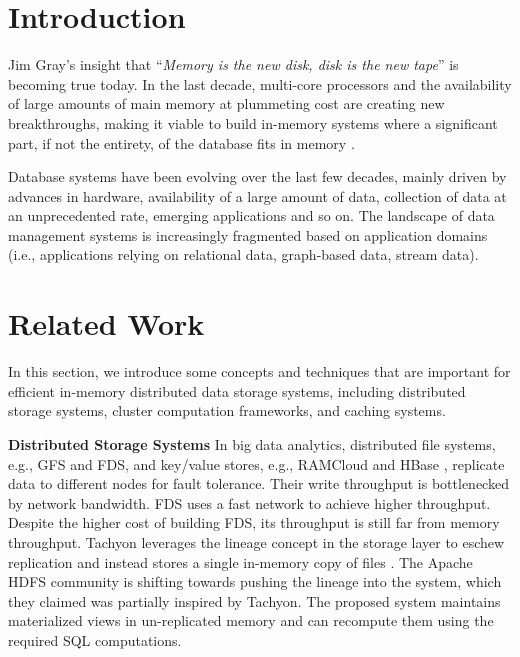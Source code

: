 \documentclass[twocolumn]{article}
\newcommand*\DNA{\textsc{dna}}
\newcommand*\Let[2]{\State #1 $\gets$ #2}
\begin{document}

\section{Introduction}
Jim Gray's insight that ``\textit{Memory is the new disk, disk is the new tape}'' is becoming true today. 
In the last decade, multi-core processors and the availability of large amounts of main memory at
plummeting cost are creating new breakthroughs, making it viable to
build in-memory systems where a significant part, if not the entirety,
of the database fits in memory \cite{Hao:2015}.

Database systems have been evolving over the last few decades, mainly
driven by advances in hardware, availability of a large amount of data,
collection of data at an unprecedented rate, emerging applications and
so on. The landscape of data management systems is increasingly
fragmented based on application domains (i.e., applications relying on
relational data, graph-based data, stream data).

\section{Related Work}
In this section, we introduce some concepts and techniques that are important for efficient in-memory distributed data storage systems, including distributed storage systems, cluster computation frameworks, and caching systems.

\noindent
\textbf{Distributed Storage Systems} In big data analytics, distributed file systems, e.g., GFS and FDS, and key/value stores, e.g., RAMCloud \cite{Ousterhout:2015} and HBase \cite{hbase:2015}, replicate data to different nodes for fault tolerance. Their write throughput is bottlenecked by network bandwidth. FDS uses a fast network to achieve higher throughput. Despite the higher cost of building FDS, its throughput is still far from memory throughput. Tachyon leverages the lineage concept in the storage layer to eschew replication and instead stores a single in-memory copy of files \cite{Li:2014}. The Apache HDFS community is shifting towards pushing the lineage into the system, which they claimed was partially inspired by Tachyon. The proposed system maintains materialized views in un-replicated memory and can recompute them using the required SQL computations.
\end{document}
